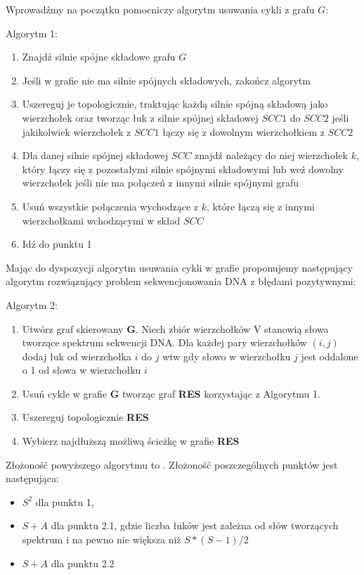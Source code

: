 \documentclass[a4paper,10pt]{article}
\begin{document}
Wprowadźmy na początku pomocniczy algorytm usuwania cykli z grafu $G$:

Algorytm 1:
\begin{enumerate}
 \item Znajdź silnie spójne składowe grafu $G$
 \item Jeśli w grafie nie ma silnie spójnych składowych, zakończ algorytm
 \item Uszereguj je topologicznie, traktując każdą silnie spójną składową jako wierzchołek oraz tworząc łuk z silnie spójnej składowej $SCC1$ do $SCC2$ jeśli jakikolwiek wierzchołek z $SCC1$ łączy się z dowolnym wierzchołkiem z $SCC2$
 \item Dla danej silnie spójnej składowej $SCC$ znajdź należący do niej wierzchołek $k$, który łączy się z pozostałymi silnie spójnymi składowymi lub weź dowolny wierzchołek jeśli nie ma połączeń z innymi silnie spójnymi grafu
 \item Usuń wszystkie połączenia wychodzące z $k$, które łączą się z innymi wierzchołkami wchodzącymi w skład $SCC$
 \item Idź do punktu 1
\end{enumerate}

Mając do dyspozycji algorytm usuwania cykli w grafie proponujemy następujący algorytm rozwiązujący problem sekwencjonowania DNA z błędami pozytywnymi:

Algorytm 2:
\begin{enumerate}
 \item Utwórz graf skierowany {\bf G}. Niech zbiór wierzchołków V stanowią słowa tworzące spektrum sekwencji DNA. Dla każdej pary wierzchołków $(i,j)$ dodaj łuk od wierzchołka $i$ do $j$ wtw gdy słowo w wierzchołku $j$ jest oddalone o 1 od słowa w wierzchołku $i$
 \item Usuń cykle w grafie {\bf G} tworząc graf {\bf RES} korzystając z Algorytmu 1.
 \item Uszereguj topologicznie {\bf RES}
 \item Wybierz najdłuższą możliwą ścieżkę w grafie {\bf RES}
\end{enumerate}

Złożoność powyższego algorytmu to $ $. Złożoność poszczególnych punktów jest następująca:
\begin{itemize}
 \item $S^2$ dla punktu 1,
 \item $S + A$ dla punktu 2.1, gdzie liczba łuków jest zależna od słów tworzących spektrum i na pewno nie większa niż $S * (S-1) / 2$
 \item $S + A$ dla punktu 2.2
\end{itemize}
\end{document}
